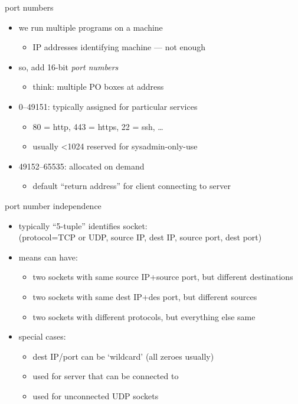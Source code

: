 \begin{frame}{port numbers}
    \begin{itemize}
    \item we run multiple programs on a machine
        \begin{itemize}
        \item IP addresses identifying machine --- not enough
        \end{itemize}
    \item<2-> so, add 16-bit \textit{port numbers}
        \begin{itemize}
        \item<2-> think: multiple PO boxes at address
        \end{itemize}
    \vspace{.5cm}
    \item<3-> 0--49151: typically assigned for particular services
        \begin{itemize}
        \item 80 = http, 443 = https, 22 = ssh, \ldots
        \item usually <1024 reserved for sysadmin-only-use
        \end{itemize}
    \item<3-> 49152--65535: allocated on demand
        \begin{itemize}
        \item default ``return address'' for client connecting to server
        \end{itemize}
    \end{itemize}
\end{frame}


\begin{frame}{port number independence}
    \begin{itemize}
    \item typically ``5-tuple'' identifies socket: \\
        (protocol=TCP or UDP, source IP, dest IP, source port, dest port)
    \item means can have:
        \begin{itemize}
        \item two sockets with same source IP+source port, but different destinations
        \item two sockets with same dest IP+des port, but different sources
        \item two sockets with different protocols, but everything else same
        \end{itemize}
    \item special cases:
        \begin{itemize}
        \item dest IP/port can be `wildcard' (all zeroes usually)
        \item used for server that can be connected to
        \item used for unconnected UDP sockets
        \end{itemize}
    \end{itemize}
\end{frame}
